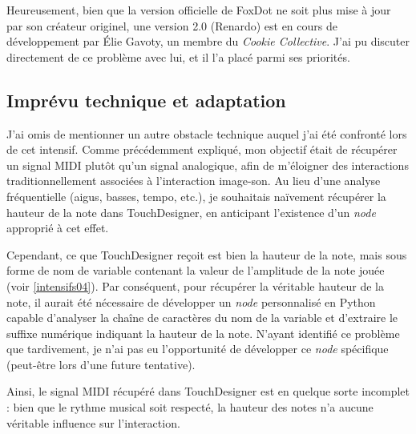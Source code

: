 Heureusement, bien que la version officielle de FoxDot ne soit plus mise à jour par son créateur originel, une version 2.0 (Renardo) est en cours de développement par Élie Gavoty, un membre du \textit{Cookie Collective}. J'ai pu discuter directement de ce problème avec lui, et il l'a placé parmi ses priorités.

\subsection*{Imprévu technique et adaptation}

J'ai omis de mentionner un autre obstacle technique auquel j'ai été confronté lors de cet intensif. Comme précédemment expliqué, mon objectif était de récupérer un signal MIDI plutôt qu'un signal analogique, afin de m'éloigner des interactions traditionnellement associées à l'interaction image-son. Au lieu d'une analyse fréquentielle (aigus, basses, tempo, etc.), je souhaitais naïvement récupérer la hauteur de la note dans TouchDesigner, en anticipant l'existence d'un \textit{node} approprié à cet effet.

Cependant, ce que TouchDesigner reçoit est bien la hauteur de la note, mais sous forme de nom de variable contenant la valeur de l'amplitude de la note jouée (voir \ref{intensifs04}). Par conséquent, pour récupérer la véritable hauteur de la note, il aurait été nécessaire de développer un \textit{node} personnalisé en Python capable d'analyser la chaîne de caractères du nom de la variable et d'extraire le suffixe numérique indiquant la hauteur de la note. N'ayant identifié ce problème que tardivement, je n'ai pas eu l'opportunité de développer ce \textit{node} spécifique (peut-être lors d'une future tentative).

Ainsi, le signal MIDI récupéré dans TouchDesigner est en quelque sorte incomplet : bien que le rythme musical soit respecté, la hauteur des notes n'a aucune véritable influence sur l'interaction.

